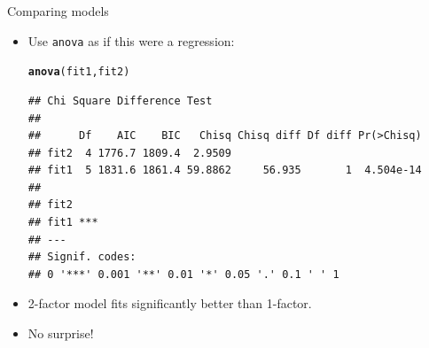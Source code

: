 \documentclass[unknownkeysallowed]{beamer}\usepackage[]{graphicx}\usepackage[]{color}
\makeatletter
\newcommand{\hlstd}[1]{\textcolor[rgb]{0.345,0.345,0.345}{#1}}%
\newcommand{\hlkwd}[1]{\textcolor[rgb]{0.737,0.353,0.396}{\textbf{#1}}}%
\newenvironment{kframe}{%
 \def\at@end@of@kframe{}%
 \ifinner\ifhmode%
  \def\at@end@of@kframe{\end{minipage}}%
  \begin{minipage}{\columnwidth}%
 \fi\fi%
 \def\FrameCommand##1{\hskip\@totalleftmargin \hskip-\fboxsep
 \colorbox{shadecolor}{##1}\hskip-\fboxsep
     \hskip-\linewidth \hskip-\@totalleftmargin \hskip\columnwidth}%
 \MakeFramed {\advance\hsize-\width
   \@totalleftmargin\z@ \linewidth\hsize
   \@setminipage}}%
 {\par\unskip\endMakeFramed%
 \at@end@of@kframe}
\newenvironment{knitrout}{}{} %
\makeatother
\begin{document}
\begin{frame}[fragile]{Comparing models}
  
  \begin{itemize}
  \item Use \texttt{anova} as if this were a regression:

\begin{knitrout}\scriptsize
{}\color{fgcolor}\begin{kframe}
\begin{alltt}
\hlkwd{anova}\hlstd{(fit1,fit2)}
\end{alltt}
\begin{verbatim}
## Chi Square Difference Test
## 
##      Df    AIC    BIC   Chisq Chisq diff Df diff Pr(>Chisq)
## fit2  4 1776.7 1809.4  2.9509                              
## fit1  5 1831.6 1861.4 59.8862     56.935       1  4.504e-14
##         
## fit2    
## fit1 ***
## ---
## Signif. codes:  
## 0 '***' 0.001 '**' 0.01 '*' 0.05 '.' 0.1 ' ' 1
\end{verbatim}
\end{kframe}
\end{knitrout}

\item 2-factor model fits significantly better than 1-factor.
\item No surprise!

    
  \end{itemize}
  
\end{frame}
\end{document}
